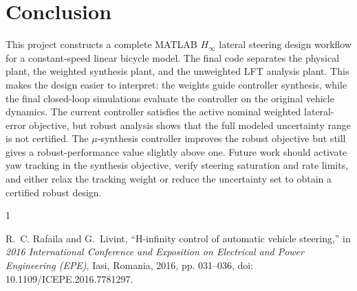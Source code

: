 \documentclass[10pt,twocolumn]{article}
\begin{document}
\section{Conclusion}

This project constructs a complete MATLAB $H_\infty$ lateral steering design
workflow for a constant-speed linear bicycle model. The final code separates
the physical plant, the weighted synthesis plant, and the unweighted LFT
analysis plant. This makes the design easier to interpret: the weights guide
controller synthesis, while the final closed-loop simulations evaluate the
controller on the original vehicle dynamics. The current controller satisfies
the active nominal weighted lateral-error objective, but robust analysis shows
that the full modeled uncertainty range is not certified. The $\mu$-synthesis
controller improves the robust objective but still gives a robust-performance
value slightly above one. Future work should activate yaw tracking in the
synthesis objective, verify steering saturation and rate limits, and either
relax the tracking weight or reduce the uncertainty set to obtain a certified
robust design.

\begin{thebibliography}{1}

R.~C. Rafaila and G.~Livint, ``H-infinity control of automatic vehicle
steering,'' in \emph{2016 International Conference and Exposition on Electrical
and Power Engineering (EPE)}, Iasi, Romania, 2016, pp. 031--036,
doi: 10.1109/ICEPE.2016.7781297.

\end{thebibliography}
\end{document}
